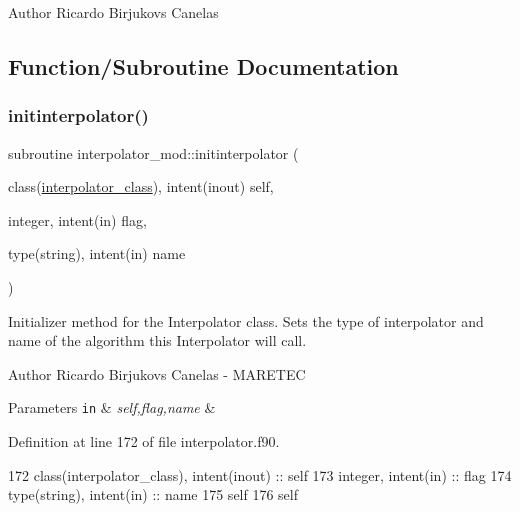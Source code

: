 \begin{DoxyAuthor}{Author}
Ricardo Birjukovs Canelas 
\end{DoxyAuthor}


\subsection{Function/\+Subroutine Documentation}
\mbox{\label{namespaceinterpolator__mod_adcaf3bba800f19991ed4f33c968184e9}} 
\subsubsection{\texorpdfstring{initinterpolator()}{initinterpolator()}}
{\footnotesize\ttfamily subroutine interpolator\+\_\+mod\+::initinterpolator (\begin{DoxyParamCaption}\item[{class(\mbox{\hyperlink{structinterpolator__mod_1_1interpolator__class}{interpolator\+\_\+class}}), intent(inout)}]{self,  }\item[{integer, intent(in)}]{flag,  }\item[{type(string), intent(in)}]{name }\end{DoxyParamCaption})\hspace{0.3cm}{\ttfamily [private]}}



Initializer method for the Interpolator class. Sets the type of interpolator and name of the algorithm this Interpolator will call. 

\begin{DoxyAuthor}{Author}
Ricardo Birjukovs Canelas -\/ M\+A\+R\+E\+T\+EC 
\end{DoxyAuthor}

\begin{DoxyParams}[1]{Parameters}
\mbox{\tt in}  & {\em self,flag,name} & \\
\hline
\end{DoxyParams}


Definition at line 172 of file interpolator.\+f90.


\begin{DoxyCode}
172     \textcolor{keywordtype}{class}(interpolator\_class), \textcolor{keywordtype}{intent(inout)} :: self
173     \textcolor{keywordtype}{integer}, \textcolor{keywordtype}{intent(in)} :: flag
174     \textcolor{keywordtype}{type}(string), \textcolor{keywordtype}{intent(in)} :: name
175     self%
176     self%
\end{DoxyCode}
\mbox{\label{namespaceinterpolator__mod_a1bf15b6fa6e4fd0bb4a8e544994c487d}} 
